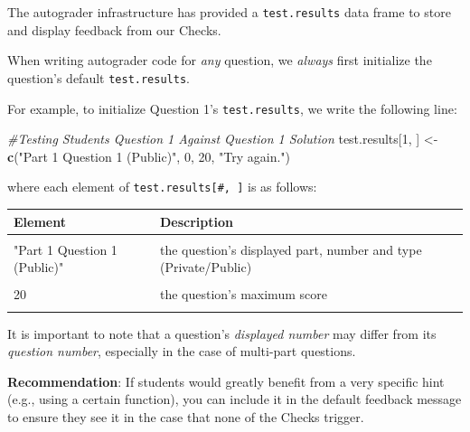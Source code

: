\documentclass[
  12pt,
]{book}
\newenvironment{Shaded}{\begin{snugshade}}{\end{snugshade}}
\newcommand{\CommentTok}[1]{\textcolor[rgb]{0.56,0.35,0.01}{\textit{#1}}}
\newcommand{\DecValTok}[1]{\textcolor[rgb]{0.00,0.00,0.81}{#1}}
\newcommand{\FunctionTok}[1]{\textcolor[rgb]{0.13,0.29,0.53}{\textbf{#1}}}
\newcommand{\NormalTok}[1]{#1}
\newcommand{\OtherTok}[1]{\textcolor[rgb]{0.56,0.35,0.01}{#1}}
\newcommand{\StringTok}[1]{\textcolor[rgb]{0.31,0.60,0.02}{#1}}
\begin{document}
The autograder infrastructure has provided a \texttt{test.results} data frame to store and display feedback from our Checks.

When writing autograder code for \emph{any} question, we \emph{always} first initialize the question's default \texttt{test.results}.

For example, to initialize Question 1's \texttt{test.results}, we write the following line:

\begin{Shaded}
\begin{Highlighting}[]
\CommentTok{\#Testing Student\textquotesingle{}s Question 1 Against Question 1 Solution}
\NormalTok{test.results[}\DecValTok{1}\NormalTok{, ] }\OtherTok{\textless{}{-}} \FunctionTok{c}\NormalTok{(}\StringTok{"Part 1 Question 1 (Public)"}\NormalTok{, }\DecValTok{0}\NormalTok{, }\DecValTok{20}\NormalTok{, }\StringTok{"Try again."}\NormalTok{)}
\end{Highlighting}
\end{Shaded}

where each element of \texttt{test.results{[}\#,\ {]}} is as follows:

\renewcommand{\arraystretch}{2}

\begin{longtable}{ll}
\toprule
\textbf{Element} & \textbf{Description}\\
\midrule
\cellcolor{gray!10}{1} & \cellcolor{gray!10}{the question's number}\\
\hline
"Part 1 Question 1 (Public)" & the question's displayed part, number and type (Private/Public)\\
\hline
\cellcolor{gray!10}{0} & \cellcolor{gray!10}{the question's default score}\\
\hline
20 & the question's maximum score\\
\hline
\cellcolor{gray!10}{"Try again."} & \cellcolor{gray!10}{the default feedback message}\\
\bottomrule
\end{longtable}

It is important to note that a question's \emph{displayed number} may differ from its \emph{question number}, especially in the case of multi-part questions.

\textbf{Recommendation}: If students would greatly benefit from a very specific hint (e.g., using a certain function), you can include it in the default feedback message to ensure they see it in the case that none of the Checks trigger.
\end{document}

